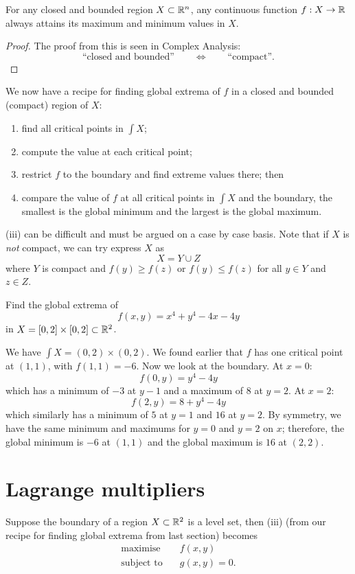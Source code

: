 
\begin{theorem}
    For any closed and bounded region $X \subset \mathbb{R}^n$,
    any continuous function $f: X \to \mathbb{R}$ 
    always attains its maximum and minimum values in $X$.
\end{theorem}

\begin{proof}
    The proof from this is seen in Complex Analysis:
    \[ \text{``closed and bounded''} 
    \qquad \iff \qquad
    \text{``compact''}.\]
\end{proof}

We now have a recipe for finding global extrema of $f$
in a closed and bounded (compact) region of $X$:

\begin{enumerate}
    \item find all critical points in $\int X$;
    \item compute the value at each critical point;
    \item restrict $f$ to the boundary and find extreme values there; then
    \item compare the value of $f$ at all critical points in $\int X$ and the boundary,
        the smallest is the global minimum and the largest is the 
        global maximum.
\end{enumerate}

(iii) can be difficult and must be argued on a case by case basis.
Note that if $X$ is \emph{not} compact, we can try express $X$ as
\[ X = Y \cup Z \]
where $Y$ is compact and $f(y) \geq f(z)$ or $f(y) \leq f(z)$ for all
$y \in Y$ and $z \in Z$.

\begin{example}
    Find the global extrema of
    \[ f(x, y) = x^4 + y^4 - 4x - 4y \]
    in $X = [0,2] \times [0,2] \subset \mathbb{R}^2$.
\end{example}

\begin{solution}
    We have $\int X = (0,2) \times (0,2)$.
    We found earlier that $f$ has one critical point at $(1, 1)$,
    with $f(1, 1) = -6$.
    Now we look at the boundary.
    At $x = 0$:
    \[ f(0, y) = y^4 - 4y \]
    which has a minimum of $-3$ at $y - 1$ and a maximum of $8$ at $y = 2$.
    At $x = 2$:
    \[ f(2, y) = 8 + y^4 - 4y \]
    which similarly has a minimum of $5$ at $y = 1$ and $16$ at $y = 2$.
    By symmetry, we have the same minimum and maximums for 
    $y = 0$ and $y = 2$ on $x$;
    therefore, the global minimum is $-6$ at $(1, 1)$ and 
    the global maximum is $16$ at $(2, 2)$.
\end{solution}

\section{Lagrange multipliers}

Suppose the boundary of a region $X \subset \mathbb{R}^2$ is a level set,
then (iii) (from our recipe for finding global extrema from last section) becomes
\begin{align*}
    \text{maximise}\quad   & f(x, y) \\
    \text{subject to}\quad & g(x, y) = 0.
\end{align*}
